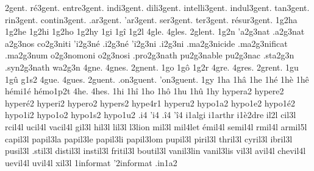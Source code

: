 {       2gent.
     ré3gent.
  entre3gent.
   indi3gent.
   dili3gent.
intelli3gent.
  indul3gent.
    tan3gent.
    rin3gent.
 contin3gent.
    .ar3gent.
    'ar3gent.
    ser3gent.
    ter3gent.
résur3gent.
%
1g2ha
1g2he
1g2hi
1g2ho
1g2hy
1gi
1gî
1g2l
4gle.
4gles.
2glent. %
    1g2n
  'a2g3nat     %
  .a2g3nat     %
   a2g3nos     %
  co2g3niti    %
  'i2g3né      %
  .i2g3né      %
  'i2g3ni      %
  .i2g3ni      %
 .ma2g3nicide  %
 .ma2g3nificat %
 .ma2g3num     %
   o2g3nomoni  %
   o2g3nosi    %
.pro2g3nath    %
  pu2g3nable   %
  pu2g3nac     %
.sta2g3n
.syn2g3nath    %
  wa2g3n
4gne.
4gnes.
2gnent. %
1go
1gô
1g2r
4gre.
4gres.
2grent. %
1gu
1gû
g1s2
4gue.
4gues.
   2guent.
.on3guent.
'on3guent.
%
1gy
1ha
1hâ
1he
1hé
1hè
1hê
                    hémi1é
                    hémo1p2t
4he.
4hes.
1hi
1hî
1ho
1hô
1hu
1hû
1hy
                    hypera2
                    hypere2
                    hyperé2
                    hyperi2
                    hypero2
                    hypers2
                    hype4r1
                    hyperu2
                    hypo1a2
                    hypo1e2 %
                    hypo1é2
                    hypo1i2
                    hypo1o2
                    hypo1s2
                    hypo1u2
.i4
'i4
.î4
'î4
                    i1algi
                    i1arthr
                    i1è2dre
    il2l
   cil3l
  rcil4l
  ucil4l
 vacil4l
   gil3l
   hil3l
   lil3l
     l3lion
   mil3l
   mil4let
  émil4l
 semil4l
  rmil4l
 armil5l
 capil3l
 papil3la
 papil3le
 papil3li
 papil3lom
 pupil3l
 piril3l
 thril3l
 cyril3l
 ibril3l
 pusil3l
 .stil3l
distil3l
instil3l
fritil3l
boutil3l
 vanil3lin
 vanil3lis
   vil3l
  avil4l
chevil4l
 uevil4l
  uvil4l
   xil3l
                    1informat %
                    '2informat
                    .in1a2
}
